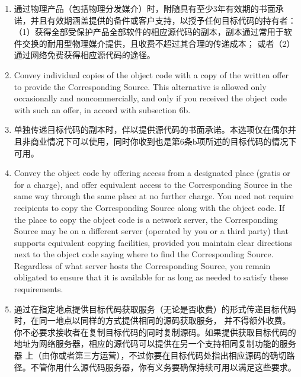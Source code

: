 \documentclass[11pt]{article}
\begin{document}
\begin{enumerate}
\begin{enumerate}
          \item 通过物理产品（包括物理分发媒介）时，附随具有至少3年有效期的书面承诺，并且有效期涵盖提供的备件或客户支持，以授予任何目标代码的持有者：
                （1）获得全部受保护产品全部软件的相应源代码的副本，副本通过常用于软件交换的耐用型物理媒介提供，且收费不超过其合理的传递成本；
                或者（2）通过网络免费获得相应源代码的途径。

          \item Convey individual copies of the object code with a copy of the
                written offer to provide the Corresponding Source.  This
                alternative is allowed only occasionally and noncommercially, and
                only if you received the object code with such an offer, in accord
                with subsection 6b.

          \item 单独传递目标代码的副本时，伴以提供源代码的书面承诺。本选项仅在偶尔并且非商业情况下可以使用，同时你收到也是第6条b项所述的目标代码的情况下可用。

          \item Convey the object code by offering access from a designated
                place (gratis or for a charge), and offer equivalent access to the
                Corresponding Source in the same way through the same place at no
                further charge.  You need not require recipients to copy the
                Corresponding Source along with the object code.  If the place to
                copy the object code is a network server, the Corresponding Source
                may be on a different server (operated by you or a third party)
                that supports equivalent copying facilities, provided you maintain
                clear directions next to the object code saying where to find the
                Corresponding Source.  Regardless of what server hosts the
                Corresponding Source, you remain obligated to ensure that it is
                available for as long as needed to satisfy these requirements.

          \item 通过在指定地点提供目标代码获取服务（无论是否收费）的形式传递目标代码时，在同一地点以同样的方式提供相同的源码获取服务，
                并不得额外收费。你不必要求接收者在复制目标代码的同时复制源码。如果提供获取目标代码的地址为网络服务器，相应的源代码可以提供在另一个支持相同复制功能的服务器
                上（由你或者第三方运营），不过你要在目标代码处指出相应源码的确切路径。不管你用什么源代码服务器，你有义务要确保持续可用以满足这些要求。


\end{enumerate}
\end{enumerate}
\end{document}
